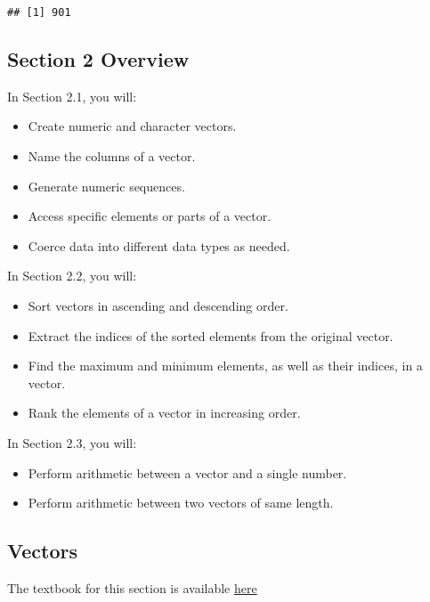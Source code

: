 \documentclass[]{article}
\providecommand{\tightlist}{%
  \setlength{\itemsep}{0pt}\setlength{\parskip}{0pt}}
\begin{document}
\begin{verbatim}
## [1] 901
\end{verbatim}

\hypertarget{section-2-overview}{%
\subsection{Section 2 Overview}\label{section-2-overview}}

In Section 2.1, you will:

\begin{itemize}
\tightlist
\item
  Create numeric and character vectors.
\item
  Name the columns of a vector.
\item
  Generate numeric sequences.
\item
  Access specific elements or parts of a vector.
\item
  Coerce data into different data types as needed.
\end{itemize}

In Section 2.2, you will:

\begin{itemize}
\tightlist
\item
  Sort vectors in ascending and descending order.
\item
  Extract the indices of the sorted elements from the original vector.
\item
  Find the maximum and minimum elements, as well as their indices, in a
  vector.
\item
  Rank the elements of a vector in increasing order.
\end{itemize}

In Section 2.3, you will:

\begin{itemize}
\tightlist
\item
  Perform arithmetic between a vector and a single number.
\item
  Perform arithmetic between two vectors of same length.
\end{itemize}

\hypertarget{vectors}{%
\subsection{Vectors}\label{vectors}}

The textbook for this section is available
\href{https://rafalab.github.io/dsbook/r-basics.html\#vectors}{here}
\end{document}

